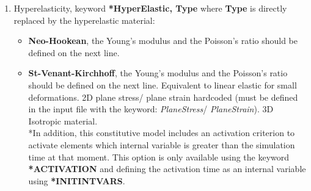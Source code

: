 \documentclass[oneside,11pt,times]{book}
\begin{document}
\begin{enumerate}
\begin{itemize}
\begin{lstlisting}[mathescape=true]
E,$\nu$,order
LinISO,$\sigma_y^0$,H
\end{lstlisting}
    \item The keyword SwiftISO for Swift hardening, \emph{i.e.} $\sigma_y =\sigma_y^0\left(1+ p/p_0 \right)^n$ where $\sigma_y^0$ is the initial yield stress, $p$ is the equivalent plastic strain and  $p_0$, $n$ are constants. To deine a finite strain $J_2$ plasticity model using this hardening law
    \begin{lstlisting}[mathescape=true]
*J2plasticityFiniteStrain
E,$\nu$,order
SwiftISO,$\sigma_y^0$,$p_0$,$n$
\end{lstlisting}   
\item The keyword VoceISO for Voce hardening, \emph{i.e.} $\sigma_y =\sigma_y^0+ K\left[1-\exp\left(Cp\right) \right]$ where $\sigma_y^0$ is the initial yield stress, $p$ is the equivalent plastic strain and $K$, $C$ are constants. To define a finite strain $J_2$ plasticity model using this hardening law
    \begin{lstlisting}[mathescape=true]
*J2plasticityFiniteStrain
E,$\nu$,order
VoceISO,$\sigma_y^0$,$K$,$C$
\end{lstlisting}   
\end{itemize}
It is noted that the \emph{order} should be an odd number, \emph{e.g.} a value equal to 11 should be a good choice.
\item Hyperelasticity, keyword \textbf{*HyperElastic, Type} where \textbf{Type} is directly replaced by the hyperelastic material:
\begin{itemize}
    \item \textbf{Neo-Hookean}, the Young's modulus and the Poisson's ratio should be defined on the next line.
    \item \textbf{St-Venant-Kirchhoff}, the Young's modulus and the Poisson's ratio should be defined on the next line. Equivalent to linear elastic for small deformations. 2D plane stress/ plane strain hardcoded (must be defined in the input file with the keyword:  \textit{PlaneStress}/ \textit{PlaneStrain}). 3D Isotropic material.\\ *In addition, this constitutive model includes an activation criterion to activate elements which internal variable is greater than the simulation time at that moment. This option is only available using the keyword  \textbf{*ACTIVATION} and defining the activation time as an internal variable using \textbf{*INITINTVARS}.

\end{itemize}
\end{enumerate}
\end{document}
